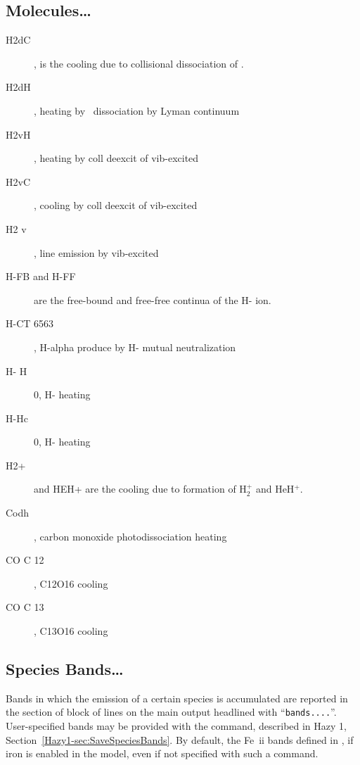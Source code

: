 \subsection{Molecules\dots}

\begin{description}

\item[H2dC], is the cooling due to collisional dissociation of \htwo.

\item[H2dH], heating by \htwo\ dissociation by Lyman continuum

\item[H2vH], heating by coll deexcit of vib-excited \htwo\

\item[H2vC], cooling by coll deexcit of vib-excited \htwo\

\item[H2 v], line emission by vib-excited \htwo\

\item[H-FB and H-FF] are the free-bound and free-free continua of the H- ion.

\item[H-CT 6563], H-alpha produce by H- mutual neutralization

\item[H- H]    0, H- heating

\item[H-Hc]    0, H- heating

\item[H2+] and HEH+ are the cooling due to formation of H$_2^+$ and HeH$^+$.

\item[Codh], carbon monoxide photodissociation heating

\item[CO C   12], C12O16 cooling

\item[CO C   13], C13O16 cooling

\end{description}


\subsection{Species Bands\dots}
\label{sec:SpeciesBands}

Bands in which the emission of a certain species is accumulated are reported in
the section of block of lines on the main output headlined with
``\verb+bands....+''.
User-specified bands may be provided with the 
command, described in Hazy 1, Section~\ref{Hazy1-sec:SaveSpeciesBands}.
By default, the Fe~{\sc ii} bands defined in ,
if iron is enabled in the model, even if not specified with such a command.

